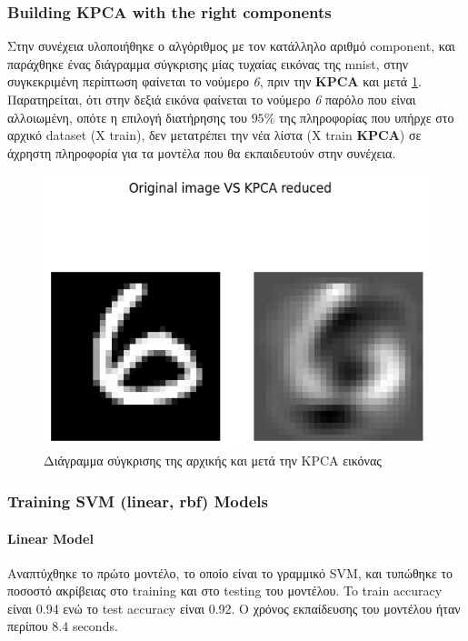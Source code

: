 \subsubsection{Building KPCA with the right components}

Στην συνέχεια υλοποιήθηκε ο αλγόριθμος με τον κατάλληλο αριθμό component, και παράχθηκε ένας διάγραμμα σύγκρισης μίας τυχαίας εικόνας της mnist, στην συγκεκριμένη περίπτωση φαίνεται το νούμερο \emph{6}, πριν την \textbf{KPCA} και μετά \ref{f:g2}. Παρατηρείται, ότι στην δεξιά εικόνα φαίνεται το νούμερο \emph{6} παρόλο που είναι αλλοιωμένη, οπότε η επιλογή διατήρησης του $95\%$ της πληροφορίας που υπήρχε στο αρχικό dataset (Χ train), δεν μετατρέπει την νέα λίστα (X train \textbf{KPCA}) σε άχρηστη πληροφορία για τα μοντέλα που θα εκπαιδευτούν στην συνέχεια.


\begin{figure}[ht]
	\centering
	\includegraphics[width=1\linewidth]{Images data1/kpcavsoriginal.png}
	\caption{ Διάγραμμα σύγκρισης της αρχικής και μετά την KPCA εικόνας}
	\label{f:g2}	
\end{figure}

\subsubsection{Training SVM (linear, rbf) Models}

\paragraph{Linear Model}

Αναπτύχθηκε το πρώτο μοντέλο, το οποίο είναι το γραμμικό SVM, και
τυπώθηκε το ποσοστό ακρίβειας στο training και στο testing του μοντέλου. To train accuracy είναι 0.94 ενώ το test
accuracy είναι 0.92. Ο χρόνος εκπαίδευσης του μοντέλου ήταν περίπου 8.4 seconds.

